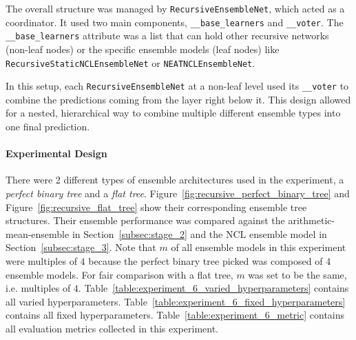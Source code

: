 The overall structure was managed by \texttt{RecursiveEnsembleNet}, which acted as a coordinator. It used two main components, \texttt{\_\_base\_learners} and \texttt{\_\_voter}. The \texttt{\_\_base\_learners} attribute was a list that can hold other recursive networks (non-leaf nodes) or the specific ensemble models (leaf nodes) like 
\\
\texttt{RecursiveStaticNCLEnsembleNet} or \texttt{NEATNCLEnsembleNet}. 

In this setup, each \texttt{RecursiveEnsembleNet} at a non-leaf level used its \texttt{\_\_voter} to combine the predictions coming from the layer right below it. This design allowed for a nested, hierarchical way to combine multiple different ensemble types into one final prediction. 


\paragraph{Experimental Design}
There were 2 different types of ensemble architectures used in the experiment, a \textit{perfect binary tree} and a \textit{flat tree}. Figure~\ref{fig:recursive_perfect_binary_tree} and Figure~\ref{fig:recursive_flat_tree} show their corresponding ensemble tree structures. Their ensemble performance was compared against the arithmetic-mean-ensemble in Section~\ref{subsec:stage_2} and the NCL ensemble model in Section~\ref{subsec:stage_3}. Note that $m$ of all ensemble models in this experiment were multiples of $4$ because the perfect binary tree picked was composed of 4 ensemble models. For fair comparison with a flat tree, $m$ was set to be the same, i.e. multiples of $4$. Table~\ref{table:experiment_6_varied_hyperparameters} contains all varied hyperparameters. Table~\ref{table:experiment_6_fixed_hyperparameters} contains all fixed hyperparameters. Table~\ref{table:experiment_6_metric} contains all evaluation metrics collected in this experiment. 

